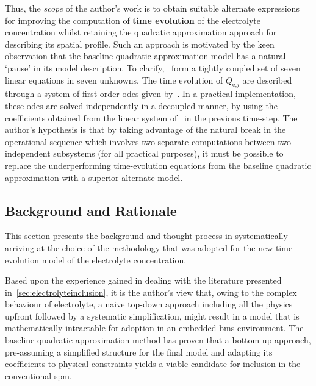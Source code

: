 Thus,   the  \emph{scope}   of  the   author's  work   is  to   obtain  suitable
alternate   expressions   for   improving  the   computation   of   \textbf{time
evolution}  of  the electrolyte  concentration  whilst  retaining the  quadratic
approximation   approach   for  describing   its   spatial   profile.  Such   an
approach  is motivated  by  the  keen observation  that  the baseline  quadratic
approximation  model  has  a  natural  `pause'  in  its  model  description.  To
clarify,~  form a  tightly
coupled set of  seven linear equations in seven unknowns.  The time evolution of
$Q_{\text{e,}j}$  are described  through  a system  of  first order  \glspl{ode}
given by~.  In a
practical  implementation,  these  \glspl{ode}  are solved  independently  in  a
decoupled  manner,\ie{}  by using  the  coefficients  obtained from  the  linear
system of~ in the previous
time-step. The  author's hypothesis is that  by taking advantage of  the natural
break  in the  operational  sequence which  involves  two separate  computations
between  two independent  subsystems (for  all practical  purposes), it  must be
possible  to  replace  the  underperforming time-evolution  equations  from  the
baseline quadratic approximation with a superior alternate model.

\subsection{Background and Rationale}\label{subsec:sysidbackground}


This  section presents  the  background and  thought  process in  systematically
arriving  at  the  choice of  the  methodology  that  was  adopted for  the  new
time-evolution model of the electrolyte concentration.

Based  upon the  experience  gained  in dealing  with  the literature  presented
in~\cref{sec:electrolyteinclusion}, it is  the author's view that,  owing to the
complex behaviour of electrolyte, a  naive top-down approach \ie{} including all
the physics upfront  followed by a systematic simplification, might  result in a
model that is  mathematically intractable for adoption in  an embedded \gls{bms}
environment.  The baseline  quadratic  approximation method  has  proven that  a
bottom-up  approach, \ie{}  pre-assuming a  simplified structure  for the  final
model  and adapting  its coefficients  to physical  constraints yields  a viable
candidate for inclusion in the conventional \gls{spm}.


